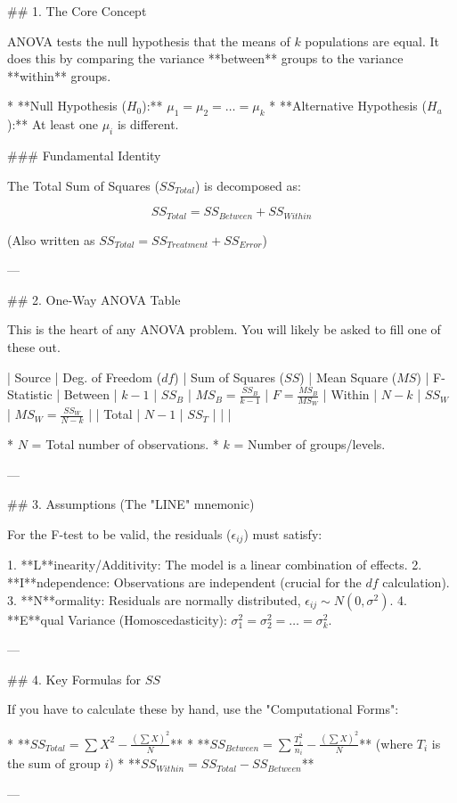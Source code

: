 ## 1. The Core Concept

ANOVA tests the null hypothesis that the means of $k$ populations are equal. It does this by comparing the variance **between** groups to the variance **within** groups.

* **Null Hypothesis ($H_0$):** $\mu_1 = \mu_2 = \dots = \mu_k$
* **Alternative Hypothesis ($H_a$):** At least one $\mu_i$ is different.

### Fundamental Identity

The Total Sum of Squares ($SS_{Total}$) is decomposed as:


$$SS_{Total} = SS_{Between} + SS_{Within}$$


(Also written as $SS_{Total} = SS_{Treatment} + SS_{Error}$)

---

## 2. One-Way ANOVA Table

This is the heart of any ANOVA problem. You will likely be asked to fill one of these out.

| Source | Deg. of Freedom ($df$) | Sum of Squares ($SS$) | Mean Square ($MS$) | F-Statistic |
Between | $k - 1$ | $SS_B$ | $MS_B = \frac{SS_B}{k-1}$ | $F = \frac{MS_B}{MS_W}$ |
Within | $N - k$ | $SS_W$ | $MS_W = \frac{SS_W}{N-k}$ |  |
Total | $N - 1$ | $SS_T$ |  |  |

* $N$ = Total number of observations.
* $k$ = Number of groups/levels.

---

## 3. Assumptions (The "LINE" mnemonic)

For the F-test to be valid, the residuals ($\epsilon_{ij}$) must satisfy:

1. **L**inearity/Additivity: The model is a linear combination of effects.
2. **I**ndependence: Observations are independent (crucial for the $df$ calculation).
3. **N**ormality: Residuals are normally distributed, $\epsilon_{ij} \sim N(0, \sigma^2)$.
4. **E**qual Variance (Homoscedasticity): $\sigma_1^2 = \sigma_2^2 = \dots = \sigma_k^2$.

---

## 4. Key Formulas for $SS$

If you have to calculate these by hand, use the "Computational Forms":

* **$SS_{Total} = \sum X^2 - \frac{(\sum X)^2}{N}$**
* **$SS_{Between} = \sum \frac{T_i^2}{n_i} - \frac{(\sum X)^2}{N}$** (where $T_i$ is the sum of group $i$)
* **$SS_{Within} = SS_{Total} - SS_{Between}$**

---

